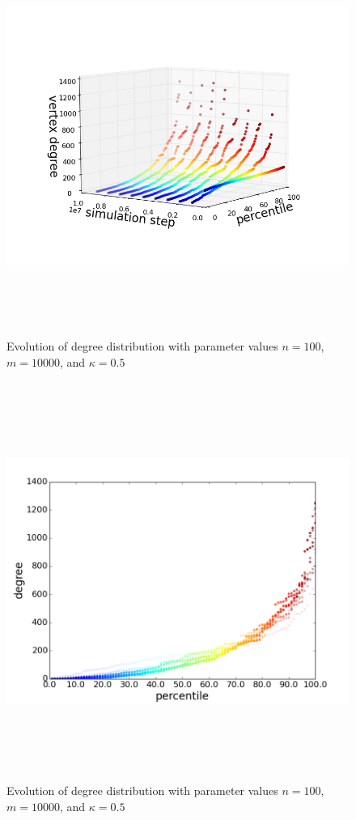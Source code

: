\documentclass[11pt]{article}
\begin{document}
\begin{figure}[h!]
  \centering
  \includegraphics[height=130mm]{n_100_long_3d}
  \caption{Evolution of degree distribution with parameter values $n=100$, $m=10000$, and $\kappa=0.5$}
  \label{fig:100l3}
\end{figure}
\begin{figure}[h!]
  \centering
  \includegraphics[height=130mm]{n_100_long_time}
  \caption{Evolution of degree distribution with parameter values $n=100$, $m=10000$, and $\kappa=0.5$}
  \label{fig:100lt}
\end{figure}
\end{document}
